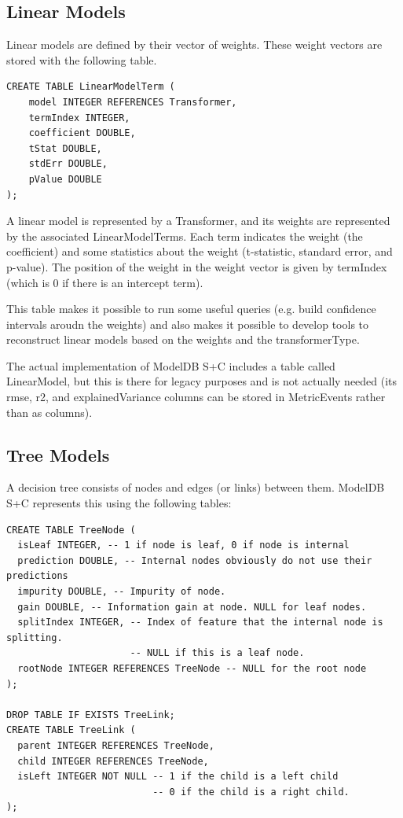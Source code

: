 \subsection{Linear Models}

Linear models are defined by their vector of weights. These weight vectors are
stored with the following table.

\begin{verbatim}
CREATE TABLE LinearModelTerm (
    model INTEGER REFERENCES Transformer,
    termIndex INTEGER,
    coefficient DOUBLE,
    tStat DOUBLE,
    stdErr DOUBLE,
    pValue DOUBLE
);
\end{verbatim}

A linear model is represented by a Transformer, and its weights are represented
by the associated LinearModelTerms. Each term indicates the weight (the coefficient) and
some statistics about the weight (t-statistic, standard error, and p-value). The position
of the weight in the weight vector is given by termIndex (which is 0 if there is an intercept
term).

This table makes it possible to run some useful queries (e.g. build confidence intervals
aroudn the weights) and also makes it possible to develop tools to reconstruct linear models
based on the weights and the transformerType.

The actual implementation of ModelDB S+C includes a table called LinearModel, but this
is there for legacy purposes and is not actually needed (its rmse, r2, and explainedVariance 
columns can be stored in MetricEvents rather than as columns).

\subsection{Tree Models}
A decision tree consists of nodes and edges (or links) between them. ModelDB S+C represents
this using the following tables:

\begin{verbatim}
CREATE TABLE TreeNode (
  isLeaf INTEGER, -- 1 if node is leaf, 0 if node is internal
  prediction DOUBLE, -- Internal nodes obviously do not use their predictions
  impurity DOUBLE, -- Impurity of node.
  gain DOUBLE, -- Information gain at node. NULL for leaf nodes.
  splitIndex INTEGER, -- Index of feature that the internal node is splitting. 
                      -- NULL if this is a leaf node.
  rootNode INTEGER REFERENCES TreeNode -- NULL for the root node
);

DROP TABLE IF EXISTS TreeLink;
CREATE TABLE TreeLink (
  parent INTEGER REFERENCES TreeNode,
  child INTEGER REFERENCES TreeNode,
  isLeft INTEGER NOT NULL -- 1 if the child is a left child 
                          -- 0 if the child is a right child.
);
\end{verbatim}

